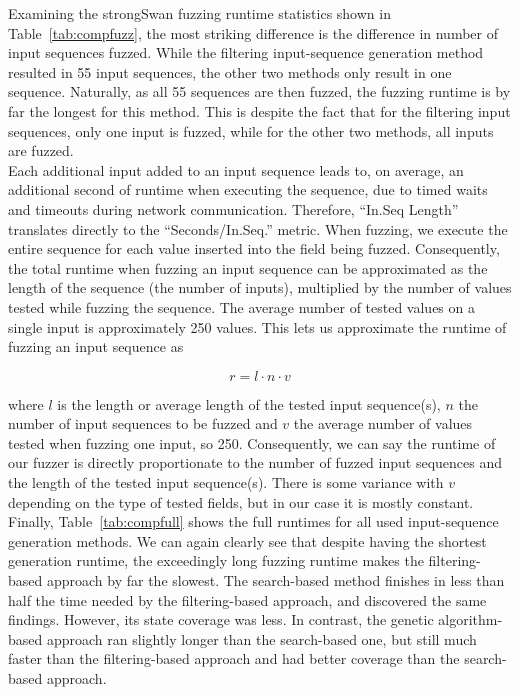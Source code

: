 Examining the strongSwan fuzzing runtime statistics shown in Table~\ref{tab:compfuzz}, the most striking difference is the difference in number of input sequences fuzzed. While the filtering input-sequence generation method resulted in 55 input sequences, the other two methods only result in one sequence. Naturally, as all 55 sequences are then fuzzed, the fuzzing runtime is by far the longest for this method. This is despite the fact that for the filtering input sequences, only one input is fuzzed, while for the other two methods, all inputs are fuzzed. \\

Each additional input added to an input sequence leads to, on average, an additional second of runtime when executing the sequence, due to timed waits and timeouts during network communication. Therefore, ``In.Seq Length'' translates directly to the  ``Seconds/In.Seq.'' metric. When fuzzing, we execute the entire sequence for each value inserted into the field being fuzzed. Consequently, the total runtime when fuzzing an input sequence can be approximated as the length of the sequence (the number of inputs), multiplied by the number of values tested while fuzzing the sequence. The average number of tested values on a single input is approximately 250 values. This lets us approximate the runtime of fuzzing an input sequence as

\begin{equation}
	r = l \cdot n \cdot v
\end{equation}
\vspace{3mm}

where $l$ is the length or average length of the tested input sequence(s), $n$ the number of input sequences to be fuzzed and $v$ the average number of values tested when fuzzing one input, so 250. Consequently, we can say the runtime of our fuzzer is directly proportionate to the number of fuzzed input sequences and the length of the tested input sequence(s). There is some variance with $v$ depending on the type of tested fields, but in our case it is mostly constant. 
\newpage
Finally, Table~\ref{tab:compfull} shows the full runtimes for all used input-sequence generation methods. We can again clearly see that despite having the shortest generation runtime, the exceedingly long fuzzing runtime makes the filtering-based approach by far the slowest. The search-based method finishes in less than half the time needed by the filtering-based approach, and discovered the same findings. However, its state coverage was less. In contrast, the genetic algorithm-based approach ran slightly longer than the search-based one, but still much faster than the filtering-based approach and had better coverage than the search-based approach.

